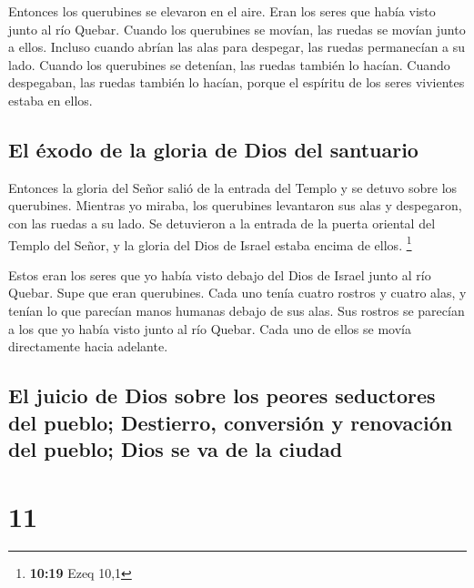  Entonces los querubines se elevaron en el aire. Eran los
seres que había visto junto al río Quebar.  Cuando los
querubines se movían, las ruedas se movían junto a ellos. Incluso cuando
abrían las alas para despegar, las ruedas permanecían a su lado.
 Cuando los querubines se detenían, las ruedas también lo
hacían. Cuando despegaban, las ruedas también lo hacían, porque el
espíritu de los seres vivientes estaba en ellos.

\hypertarget{el-uxe9xodo-de-la-gloria-de-dios-del-santuario}{%
\subsection{El éxodo de la gloria de Dios del
santuario}\label{el-uxe9xodo-de-la-gloria-de-dios-del-santuario}}

 Entonces la gloria del Señor salió de la entrada del
Templo y se detuvo sobre los querubines.  Mientras yo
miraba, los querubines levantaron sus alas y despegaron, con las ruedas
a su lado. Se detuvieron a la entrada de la puerta oriental del Templo
del Señor, y la gloria del Dios de Israel estaba encima de ellos.
\footnote{\textbf{10:19} Ezeq 10,1}

 Estos eran los seres que yo había visto debajo del Dios
de Israel junto al río Quebar. Supe que eran querubines. 
Cada uno tenía cuatro rostros y cuatro alas, y tenían lo que parecían
manos humanas debajo de sus alas.  Sus rostros se
parecían a los que yo había visto junto al río Quebar. Cada uno de ellos
se movía directamente hacia adelante.

\hypertarget{el-juicio-de-dios-sobre-los-peores-seductores-del-pueblo-destierro-conversiuxf3n-y-renovaciuxf3n-del-pueblo-dios-se-va-de-la-ciudad}{%
\subsection{El juicio de Dios sobre los peores seductores del pueblo;
Destierro, conversión y renovación del pueblo; Dios se va de la
ciudad}\label{el-juicio-de-dios-sobre-los-peores-seductores-del-pueblo-destierro-conversiuxf3n-y-renovaciuxf3n-del-pueblo-dios-se-va-de-la-ciudad}}

\hypertarget{section-10}{%
\section{11}\label{section-10}}

